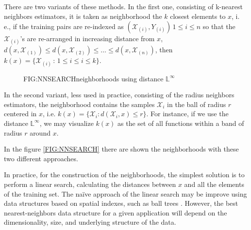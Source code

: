 There are two variants of these methods. In the first one, consisting of
k-nearest neighbors estimators, it is taken as neighborhood the $k$ closest
elements to $x$, i. e., if the training pairs are re-indexed as
$(\mathcal{X}_{(i)}, Y_{(i)}) \, 1\le i\le n$ so that the
$\mathcal{X}_{(i)}$'s are re-arranged in increasing distance from $x$,
$d(x, \mathcal{X}_{(1)}) \le d(x, \mathcal{X}_{(2)}) \le \dots \le d(x, \mathcal{X}_{(n)})$,
 then $k(x) = \{\mathcal{X}_{(i)} \, : \, 1 \le i \le i\le k\}$.

\begin{figure}[Neighborhoods using distance $\mathbb{L}^\infty$]{FIG:NNSEARCH}{neighborhoods using distance $\mathbb{L}^\infty$}
	 \quad
\end{figure}

In the second variant, less used in practice, consisting of the radius neighbors
estimators, the neighborhood contains the samples $\mathcal{X}_i$ in the ball of
radius $r$ centered in $x$, i.e.
$k(x) = \{ \mathcal{X}_i : d(\mathcal{X}_i , x) \le r\}$. For instance, if we
use the distance $\mathbb{L}^\infty$, we may visualize $k(x)$ as the set of all
functions within a band  of radius $r$ around $x$.

In the figure \ref{FIG:NNSEARCH} there are shown the neighborhoods with these two different
approaches.

In practice, for the construction of the neighborhoods, the simplest solution is
 to perform a linear search, calculating the distances between $x$ and all the
 elements of the training set.
The naïve approach of the linear search may be improve using data structures
based on spatial indexes, such as ball trees \cite{Kumar2008}. However, the best
nearest-neighbors data structure for a given application will depend on the
dimensionality, size, and underlying structure of the data.
